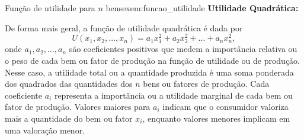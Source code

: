 \begin{example}{Função de utilidade para $n$ bens}{exem:funcao_utilidade}
\textbf{Utilidade Quadrática:}\smallskip

De forma mais geral, a função de utilidade quadrática é dada por 
\[ U(x_1, x_2, \ldots, x_n) = a_1 x_1^2 + a_2 x_2^2 + \ldots + a_n x_n^2, \]
onde \( a_1, a_2, \ldots, a_n \) são coeficientes positivos que medem a importância relativa ou o peso de cada bem ou fator de produção na função de utilidade ou de produção. Nesse caso, a utilidade total ou a quantidade produzida é uma soma ponderada dos quadrados das quantidades dos \( n \) bens ou fatores de produção. Cada coeficiente \( a_i \) representa a importância ou a utilidade marginal de cada bem ou fator de produção. Valores maiores para \( a_i \) indicam que o consumidor valoriza mais a quantidade do bem ou fator \( x_i \), enquanto valores menores implicam em uma valoração menor.



\end{example}


